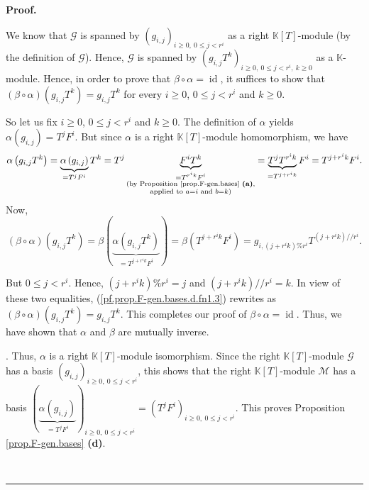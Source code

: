 \documentclass[numbers=enddot,12pt,final,onecolumn,notitlepage]{scrartcl}%
\theoremstyle{definition}
\newenvironment{proof}[1][Proof]{\noindent\textbf{#1.} }{\ \rule{0.5em}{0.5em}}
\begin{document}
\begin{proof}
{\par
We know that $\mathcal{G}$ is spanned by $\left(  g_{i,j}\right)
_{i\geq0,\ 0\leq j<r^{i}}$ as a right $\mathbb{K}\left[  T\right]  $-module
(by the definition of $\mathcal{G}$). Hence, $\mathcal{G}$ is spanned by
$\left(  g_{i,j}T^{k}\right)  _{i\geq0,\ 0\leq j<r^{i},\ k\geq0}$ as a
$\mathbb{K}$-module. Hence, in order to prove that $\beta\circ\alpha
=\operatorname*{id}$, it suffices to show that $\left(  \beta\circ
\alpha\right)  \left(  g_{i,j}T^{k}\right)  =g_{i,j}T^{k}$ for every $i\geq0$,
$0\leq j<r^{i}$ and $k\geq0$.
\par
So let us fix $i\geq0$, $0\leq j<r^{i}$ and $k\geq0$. The definition of
$\alpha$ yields $\alpha\left(  g_{i,j}\right)  =T^{j}F^{i}$. But since
$\alpha$ is a right $\mathbb{K}\left[  T\right]  $-module homomorphism, we
have%
\[
\alpha\left(  g_{i,j}T^{k}\right)  =\underbrace{\alpha\left(  g_{i,j}\right)
}_{=T^{j}F^{i}}T^{k}=T^{j}\underbrace{F^{i}T^{k}}_{\substack{=T^{r^{i}k}%
F^{i}\\\text{(by Proposition \ref{prop.F-gen.bases} \textbf{(a)}%
,}\\\text{applied to }a=i\text{ and }b=k\text{)}}}=\underbrace{T^{j}T^{r^{i}%
k}}_{=T^{j+r^{i}k}}F^{i}=T^{j+r^{i}k}F^{i}.
\]
Now,%
\begin{equation}
\left(  \beta\circ\alpha\right)  \left(  g_{i,j}T^{k}\right)  =\beta\left(
\underbrace{\alpha\left(  g_{i,j}T^{k}\right)  }_{=T^{j+r^{i}k}F^{i}}\right)
=\beta\left(  T^{j+r^{i}k}F^{i}\right)  =g_{i,\left(  j+r^{i}k\right)
\%r^{i}}T^{\left(  j+r^{i}k\right)  //r^{i}}.
\label{pf.prop.F-gen.bases.d.fn1.3}%
\end{equation}
\par
But $0\leq j<r^{i}$. Hence, $\left(  j+r^{i}k\right)  \%r^{i}=j$ and $\left(
j+r^{i}k\right)  //r^{i}=k$. In view of these two equalities,
(\ref{pf.prop.F-gen.bases.d.fn1.3}) rewrites as $\left(  \beta\circ
\alpha\right)  \left(  g_{i,j}T^{k}\right)  =g_{i,j}T^{k}$. This completes our
proof of $\beta\circ\alpha=\operatorname*{id}$. Thus, we have shown that
$\alpha$ and $\beta$ are mutually inverse.}. Thus, $\alpha$ is a right
$\mathbb{K}\left[  T\right]  $-module isomorphism. Since the right
$\mathbb{K}\left[  T\right]  $-module $\mathcal{G}$ has a basis $\left(
g_{i,j}\right)  _{i\geq0,\ 0\leq j<r^{i}}$, this shows that the right
$\mathbb{K}\left[  T\right]  $-module $\mathcal{M}$ has a basis $\left(
\underbrace{\alpha\left(  g_{i,j}\right)  }_{=T^{j}F^{i}}\right)
_{i\geq0,\ 0\leq j<r^{i}}=\left(  T^{j}F^{i}\right)  _{i\geq0,\ 0\leq j<r^{i}%
}$. This proves Proposition \ref{prop.F-gen.bases} \textbf{(d)}.


\end{proof}
\end{document}
